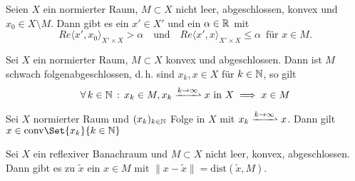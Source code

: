 \documentclass{cheat-sheet}
\newcommand{\K}{\mathbb{K}}
\newcommand{\convWeaklyWith}[1]{\xrightharpoonup{#1 \to \infty}} %
\begin{document}



\begin{satz}[Trennungssatz]
  Seien $X$ ein normierter Raum, $M \subset X$ nicht leer, abgeschlossen, konvex und $x_0 \in X \setminus M$. Dann gibt es ein $x' \in X'$ und ein $\alpha \in \mathbb{R}$ mit
  \[ Re \langle x', x_0 \rangle_{X' \times X} > \alpha \quad \text{und} \quad Re \langle x', x \rangle_{X' \times X} \leq \alpha \enspace \text{für } x \in M. \]
\end{satz}



\begin{satz}
  Sei $X$ ein normierter Raum, $M \subset X$ konvex und abgeschlossen. Dann ist $M$ schwach folgenabgeschlossen, d.\,h. sind $x_k, x \in X$ für $k \in \mathbb{N}$, so gilt
  \[ \fa{k \in \N} x_k \in M, x_k \convWeaklyWith{k} x \text{ in } X \implies x \in M \]
\end{satz}

\begin{lem}[Mazur]
  Sei $X$ normierter Raum und $(x_k)_{k \in \mathbb{N}}$ Folge in $X$ mit $x_k \convWeaklyWith{k} x$. Dann gilt $x \in \mathrm{conv} \Set{ x_k }{ k \in \N }$
\end{lem}

\begin{satz}
  Sei $X$ ein reflexiver Banachraum und $M \subset X$ nicht leer, konvex, abgeschlossen. Dann gibt es zu $\tilde{x}$ ein $x \in M$ mit $\| x - \tilde{x} \| = \mathrm{dist}(\tilde{x}, M)$.
\end{satz}


\end{document}
